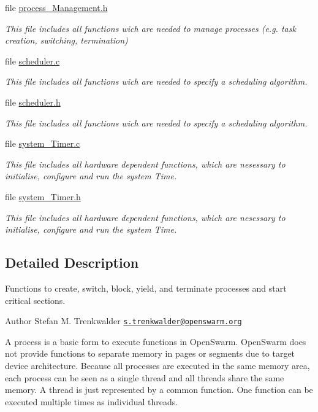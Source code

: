 \begin{DoxyCompactItemize}
file \hyperlink{process__Management_8h}{process\+\_\+\+Management.\+h}
\begin{DoxyCompactList}\small\item\em This file includes all functions wich are needed to manage processes (e.\+g. task creation, switching, termination) \end{DoxyCompactList}\item 
file \hyperlink{scheduler_8c}{scheduler.\+c}
\begin{DoxyCompactList}\small\item\em This file includes all functions wich are needed to specify a scheduling algorithm. \end{DoxyCompactList}\item 
file \hyperlink{scheduler_8h}{scheduler.\+h}
\begin{DoxyCompactList}\small\item\em This file includes all functions wich are needed to specify a scheduling algorithm. \end{DoxyCompactList}\item 
file \hyperlink{system__Timer_8c}{system\+\_\+\+Timer.\+c}
\begin{DoxyCompactList}\small\item\em This file includes all hardware dependent functions, which are nesessary to initialise, configure and run the system Time. \end{DoxyCompactList}\item 
file \hyperlink{system__Timer_8h}{system\+\_\+\+Timer.\+h}
\begin{DoxyCompactList}\small\item\em This file includes all hardware dependent functions, which are nesessary to initialise, configure and run the system Time. \end{DoxyCompactList}\end{DoxyCompactItemize}


\subsection{Detailed Description}
Functions to create, switch, block, yield, and terminate processes and start critical sections. 

\begin{DoxyAuthor}{Author}
Stefan M. Trenkwalder \href{mailto:s.trenkwalder@openswarm.org}{\tt s.\+trenkwalder@openswarm.\+org}
\end{DoxyAuthor}
A process is a basic form to execute functions in Open\+Swarm. Open\+Swarm does not provide functions to separate memory in pages or segments due to target device architecture. Because all processes are executed in the same memory area, each process can be seen as a single thread and all threads share the same memory. A thread is just represented by a common function. One function can be executed multiple times as individual threads.

